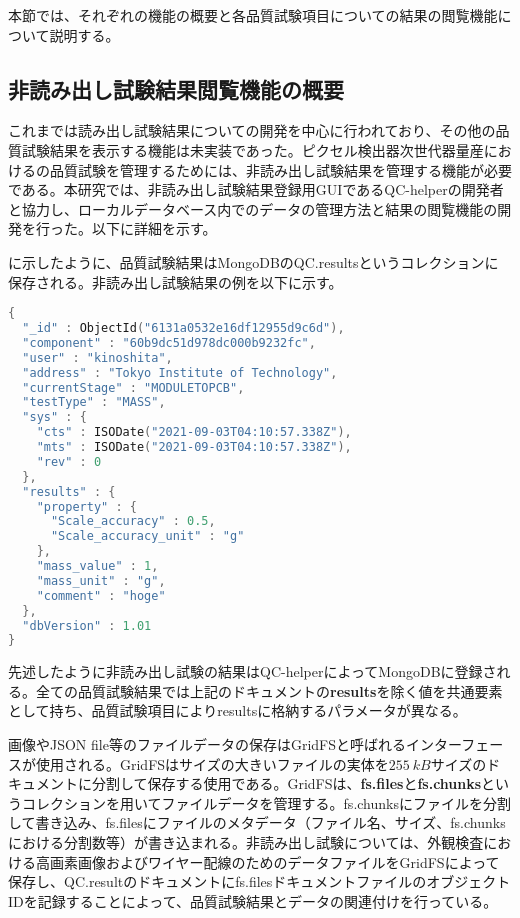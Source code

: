 本節では、それぞれの機能の概要と各品質試験項目についての結果の閲覧機能について説明する。


\subsection{非読み出し試験結果閲覧機能の概要}
\label{sec:non-elec-data}

これまでは読み出し試験結果についての開発を中心に行われており、その他の品質試験結果を表示する機能は未実装であった。ピクセル検出器次世代器量産におけるの品質試験を管理するためには、非読み出し試験結果を管理する機能が必要である。本研究では、非読み出し試験結果登録用GUIであるQC-helperの開発者と協力し、ローカルデータベース内でのデータの管理方法と結果の閲覧機能の開発を行った。以下に詳細を示す。

に示したように、品質試験結果はMongoDBのQC.resultsというコレクションに保存される。非読み出し試験結果の例を以下に示す。

\begin{lstlisting}[caption=品質試験結果を表すドキュメントの例。以下は質量測定結果の一つを表している。,label=code:nonele, language=C++]
{
  "_id" : ObjectId("6131a0532e16df12955d9c6d"),
  "component" : "60b9dc51d978dc000b9232fc",
  "user" : "kinoshita",
  "address" : "Tokyo Institute of Technology",
  "currentStage" : "MODULETOPCB",
  "testType" : "MASS",
  "sys" : {
    "cts" : ISODate("2021-09-03T04:10:57.338Z"),
    "mts" : ISODate("2021-09-03T04:10:57.338Z"),
    "rev" : 0
  },
  "results" : {
    "property" : {
      "Scale_accuracy" : 0.5,
      "Scale_accuracy_unit" : "g"
    },
    "mass_value" : 1,
    "mass_unit" : "g",
    "comment" : "hoge"
  },
  "dbVersion" : 1.01
}
\end{lstlisting}

先述したように非読み出し試験の結果はQC-helperによってMongoDBに登録される。全ての品質試験結果では上記のドキュメントの\textbf{results}を除く値を共通要素として持ち、品質試験項目によりresultsに格納するパラメータが異なる。

画像やJSON file等のファイルデータの保存はGridFS\cite{mongo}と呼ばれるインターフェースが使用される。GridFSはサイズの大きいファイルの実体を$255\ \si{kB}$サイズのドキュメントに分割して保存する使用である。GridFSは、\textbf{fs.files}と\textbf{fs.chunks}というコレクションを用いてファイルデータを管理する。fs.chunksにファイルを分割して書き込み、fs.filesにファイルのメタデータ（ファイル名、サイズ、fs.chunksにおける分割数等）が書き込まれる。非読み出し試験については、外観検査における高画素画像およびワイヤー配線のためのデータファイルをGridFSによって保存し、QC.resultのドキュメントにfs.filesドキュメントファイルのオブジェクトIDを記録することによって、品質試験結果とデータの関連付けを行っている。


